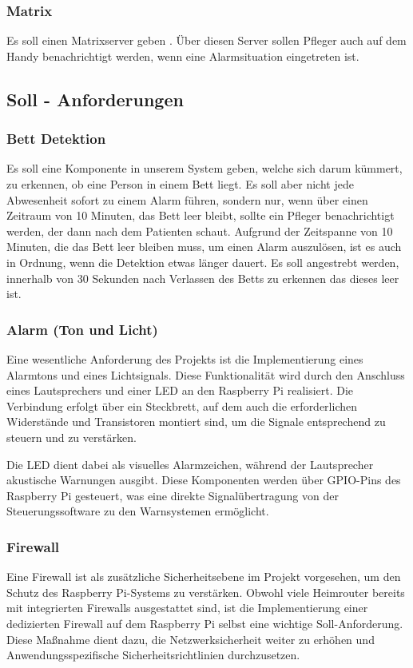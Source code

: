 \subsubsection{Matrix}
Es soll einen Matrixserver geben \cite{Matrix} . Über diesen Server sollen Pfleger auch auf dem Handy benachrichtigt werden, wenn eine Alarmsituation eingetreten ist. 



\subsection{Soll - Anforderungen}

\subsubsection{Bett Detektion}
Es soll eine Komponente in unserem System geben, welche sich darum kümmert, zu erkennen, ob eine Person in einem Bett liegt. Es soll aber nicht jede Abwesenheit sofort zu einem Alarm führen, sondern nur, wenn über einen Zeitraum von 10 Minuten, das Bett leer bleibt, sollte ein Pfleger benachrichtigt werden, der dann nach dem Patienten schaut. Aufgrund der Zeitspanne von 10 Minuten, die das Bett leer bleiben muss, um einen Alarm auszulösen, ist es auch in Ordnung, wenn die Detektion etwas länger dauert. Es soll angestrebt werden, innerhalb von 30 Sekunden nach Verlassen des Betts zu erkennen das dieses leer ist. 

\subsubsection{Alarm (Ton und Licht)}
Eine wesentliche Anforderung des Projekts ist die Implementierung eines Alarmtons und eines Lichtsignals. Diese Funktionalität wird durch den Anschluss eines Lautsprechers und einer LED an den Raspberry Pi realisiert. Die Verbindung erfolgt über ein Steckbrett, auf dem auch die erforderlichen Widerstände und Transistoren montiert sind, um die Signale entsprechend zu steuern und zu verstärken.

Die LED dient dabei als visuelles Alarmzeichen, während der Lautsprecher akustische Warnungen ausgibt. Diese Komponenten werden über GPIO-Pins des Raspberry Pi gesteuert, was eine direkte Signalübertragung von der Steuerungssoftware zu den Warnsystemen ermöglicht.

\subsubsection{Firewall}
Eine Firewall ist als zusätzliche Sicherheitsebene im Projekt vorgesehen, um den Schutz des Raspberry Pi-Systems zu verstärken. Obwohl viele Heimrouter bereits mit integrierten Firewalls ausgestattet sind, ist die Implementierung einer dedizierten Firewall auf dem Raspberry Pi selbst eine wichtige Soll-Anforderung. Diese Maßnahme dient dazu, die Netzwerksicherheit weiter zu erhöhen und Anwendungsspezifische Sicherheitsrichtlinien durchzusetzen.

